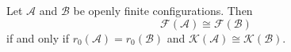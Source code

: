 Let $\mathcal{A}$ and $\mathcal{B}$ be openly finite configurations. Then
$$\mathcal{F}(\mathcal{A}) \cong \mathcal{F}(\mathcal{B})$$
if and only if $r_0(\mathcal{A}) = r_0(\mathcal{B})$ and $\mathcal{K}(\mathcal{A}) \cong \mathcal{K}(\mathcal{B})$.
